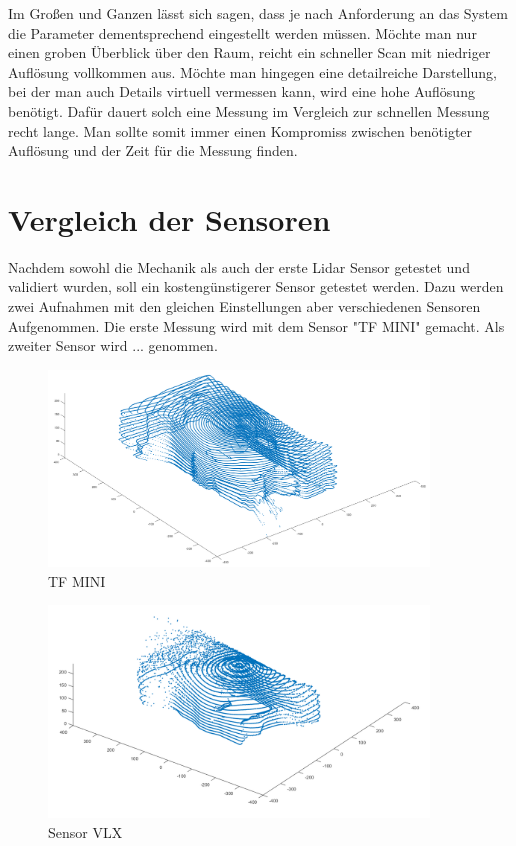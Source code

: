 Im Großen und Ganzen lässt sich sagen, dass je nach Anforderung an das System die Parameter dementsprechend eingestellt werden müssen. Möchte man nur einen groben Überblick über den Raum, reicht ein schneller Scan mit niedriger Auflösung vollkommen aus. Möchte man hingegen eine detailreiche Darstellung, bei der man auch Details virtuell vermessen kann, wird eine hohe Auflösung benötigt. Dafür dauert solch eine Messung im Vergleich zur schnellen Messung recht lange.
Man sollte somit immer einen Kompromiss zwischen benötigter Auflösung und der Zeit für die Messung finden.



\section{Vergleich der Sensoren}

Nachdem sowohl die Mechanik als auch der erste Lidar Sensor getestet und validiert wurden, soll ein kostengünstigerer Sensor getestet werden. Dazu werden zwei Aufnahmen mit den gleichen Einstellungen aber verschiedenen Sensoren Aufgenommen. Die erste Messung wird mit dem Sensor "TF MINI" gemacht. Als zweiter Sensor wird ... genommen.

 

\begin{figure}[H]
	\centering
	\includegraphics[width=0.9\textwidth]{images/Validierung/Aufloesungen/mittel.png}
	\caption{TF MINI}
	\label{hoch}
\end{figure}

\begin{figure}[H]
	\centering
	\includegraphics[width=0.9\textwidth]{images/Validierung/VLX_gerade.png}
	\caption{Sensor VLX}
	\label{vlx}
\end{figure}

